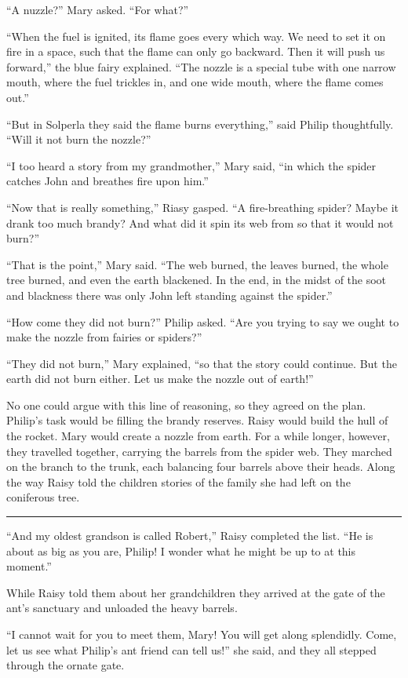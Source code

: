 \documentclass[10pt, draft]{memoir}
\renewcommand{\pfbreakdisplay}{\bigskip \ding{166} \bigskip}
\newcommand{\secbreak}{\fancybreak{\pfbreakdisplay}}
\begin{document}
``A nuzzle?'' Mary asked. ``For what?''

``When the fuel is ignited, its flame goes every which way. We need to set it on fire in a space, such that the flame can only go backward. Then it will push us forward,'' the blue fairy explained. ``The nozzle is a special tube with one narrow mouth, where the fuel trickles in, and one wide mouth, where the flame comes out.''

``But in Solperla they said the flame burns everything,'' said Philip thoughtfully. ``Will it not burn the nozzle?''

``I too heard a story from my grandmother,'' Mary said, ``in which the spider catches John and breathes fire upon him.''

``Now that is really something,'' Riasy gasped. ``A fire-breathing spider? Maybe it drank too much brandy? And what did it spin its web from so that it would not burn?''

``That is the point,'' Mary said. ``The web burned, the leaves burned, the whole tree burned, and even the earth blackened. In the end, in the midst of the soot and blackness there was only John left standing against the spider.''

``How come they did not burn?'' Philip asked. ``Are you trying to say we ought to make the nozzle from fairies or spiders?''

``They did not burn,'' Mary explained, ``so that the story could continue. But the earth did not burn either. Let us make the nozzle out of earth!''

No one could argue with this line of reasoning, so they agreed on the plan. Philip's task would be filling the brandy reserves. Raisy would build the hull of the rocket. Mary would create a nozzle from earth. For a while longer, however, they travelled together, carrying the barrels from the spider web. They marched on the branch to the trunk, each balancing four barrels above their heads. Along the way Raisy told the children stories of the family she had left on the coniferous tree.

\secbreak

``And my oldest grandson is called Robert,'' Raisy completed the list. ``He is about as big as you are, Philip! I wonder what he might be up to at this moment.''

While Raisy told them about her grandchildren they arrived at the gate of the ant's sanctuary and unloaded the heavy barrels.

``I cannot wait for you to meet them, Mary! You will get along splendidly. Come, let us see what Philip's ant friend can tell us!'' she said, and they all stepped through the ornate gate.
\end{document}
